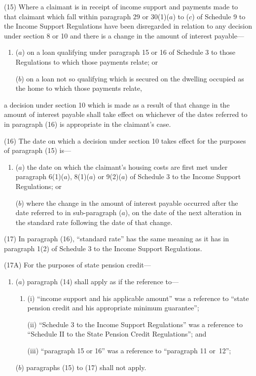 \documentclass[12pt,a4paper]{article}
\begin{document}
(15) Where a claimant is in receipt of income support and payments made to that claimant which fall within paragraph 29 or 30(1)($a$) to ($c$) of Schedule 9 to the Income Support Regulations have been disregarded in relation to any decision under section 8 or 10 and there is a change in the amount of interest payable—
\begin{enumerate}\item[]
($a$) on a loan qualifying under paragraph 15 or 16 of Schedule 3 to those Regulations to which those payments relate; or

($b$) on a loan not so qualifying which is secured on the dwelling occupied as the home to which those payments relate,
\end{enumerate}
a decision under section 10 which is made as a result of that change in the amount of interest payable shall take effect on whichever of the dates referred to in paragraph (16) is appropriate in the claimant’s case.

(16) The date on which a decision under section 10 takes effect for the purposes of paragraph (15) is—
\begin{enumerate}\item[]
($a$) the date on which the claimant’s housing costs are first met under paragraph 6(1)($a$), 8(1)($a$) or 9(2)($a$) of Schedule 3 to the Income Support Regulations; or

($b$) where the change in the amount of interest payable occurred after the date referred to in sub-paragraph ($a$), on the date of the next alteration in the standard rate following the date of that change.
\end{enumerate}

(17) In paragraph (16), “standard rate” has the same meaning as it has in paragraph 1(2) of Schedule 3 to the Income Support Regulations.

(17A) For the purposes of state pension credit—
\begin{enumerate}\item[]
($a$) paragraph (14) shall apply as if the reference to—
\begin{enumerate}\item[]
(i) “income support and his applicable amount” was a reference to “state pension credit and his appropriate minimum guarantee”;

(ii) “Schedule 3 to the Income Support Regulations” was a reference to “Schedule II to the State Pension Credit Regulations”; and

(iii) “paragraph 15 or 16” was a reference to “paragraph 11 or~12”;
\end{enumerate}

($b$) paragraphs (15) to (17) shall not apply.
\end{enumerate}
\end{document}
